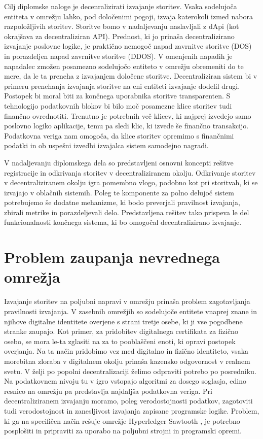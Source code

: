 \documentclass[a4paper, 12pt]{book}
\begin{document}
Cilj diplomske naloge je decenralizirati izvajanje storitev. Vsaka sodelujoča entiteta v omrežju lahko, pod določenimi pogoji, izvaja katerokoli izmed nabora razpoložljivih storitev.
Storitve bomo v nadaljevanju naslavljali z dApi (kot okrajšava za decentraliziran API).
Prednost, ki jo prinaša decentralizirano izvajanje poslovne logike, je praktično nemogoč napad zavrnitve storitve (DOS) in porazdeljen napad zavrnitve storitve (DDOS).
V omenjenih napadih je napadalec zmožen posamezno sodelujočo entiteto v omrežju obremeniti do te mere, da le ta preneha z izvajanjem določene storitve.
Decentraliziran sistem bi v primeru prenehanja izvajanja storitve na eni entiteti izvajanje dodelil drugi. Postopek bi moral biti za končnega uporabnika storitve transparenten.
S tehnologijo podatkovnih blokov bi bilo moč posamezne klice storitev tudi finančno ovrednotiti.
Trenutno je potrebnih več klicev, ki najprej izvedejo samo poslovno logiko aplikacije, temu pa sledi klic, ki izvede še finančno transakcijo.
Podatkovna veriga nam omogoča, da klice storitev opremimo s finančnimi podatki in ob uspešni izvedbi izvajalca sistem samodejno nagradi.

V nadaljevanju diplomskega dela so predstavljeni osnovni koncepti rešitve registracije in odkrivanja storitev v decentraliziranem okolju.
Odkrivanje storitev v decentraliziranem okolju igra pomembno vlogo, podobno kot pri storitvah, ki se izvajajo v oblačnih sistemih.
Poleg te komponente za polno delujoč sistem potrebujemo še dodatne mehanizme, ki bodo preverjali pravilnost izvajanja, zbirali metrike in porazdeljevali delo.
Predstavljena rešitev tako prispeva le del funkcionalnosti končnega sistema, ki bo omogočal decentralizirano izvajanje.

\section{Problem zaupanja nevrednega omrežja}
Izvajanje storitev na poljubni napravi v omrežju prinaša problem zagotavljanja pravilnosti izvajanja.
V zasebnih omrežjih so sodelujoče entitete vnaprej znane in njihove digitalne identitete overjene s strani tretje osebe, ki ji vse pogodbene stranke zaupajo.
Kot primer, za pridobitev digitalnega certifikata za fizično osebo, se mora le-ta zglasiti na za to pooblaščeni enoti, ki opravi postopek overjanja.
Na ta način pridobimo vez med digitalno in fizično identiteto, vsaka morebitna zloraba v digitalnem okolju prinaša kazensko odgovornost v realnem svetu.
V želji po popolni decentralizaciji želimo odpraviti potrebo po posredniku.
Na podatkovnem nivoju tu v igro vstopajo algoritmi za dosego soglasja, edino resnico na omrežju pa predstavlja najdaljša podatkovna veriga.
Pri decentraliziranem izvajanju moramo, poleg verodostojnosti podatkov, zagotoviti tudi verodostojnost in zanesljivost izvajanja zapisane programske logike.
Problem, ki ga na specifičen način rešuje omrežje Hyperledger Sawtooth \cite{sawtooth}, je potrebno posplošiti in pripraviti za uporabo na poljubni strojni in programski opremi.
\end{document}
